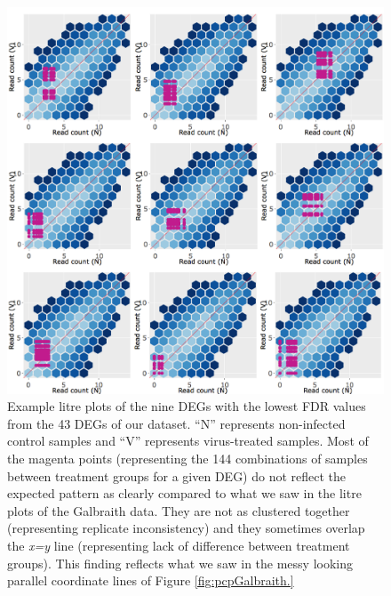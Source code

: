 \documentclass[11pt,a4paper,oldfontcommands,openany]{memoir}
\numberwithin{equation}{section} %
\begin{document}
\begin{figure}[H]
\begin{framed}
  \includegraphics[width=\textwidth]{Images/litreClusterRutter}
\end{framed}
  \caption{Example litre plots of the nine DEGs with the lowest FDR values from the 43 DEGs of our dataset. ``N'' represents non-infected control samples and ``V'' represents virus-treated samples. Most of the magenta points (representing the 144 combinations of samples between treatment groups for a given DEG) do not reflect the expected pattern as clearly compared to what we saw in the litre plots of the Galbraith data. They are not as clustered together (representing replicate inconsistency) and they sometimes overlap the \textit{x=y} line (representing lack of difference between treatment groups). This finding reflects what we saw in the messy looking parallel coordinate lines of Figure \ref{fig:pcpGalbraith.}}
  \label{fig:litreClusterRutter}
\end{figure}
\end{document}
